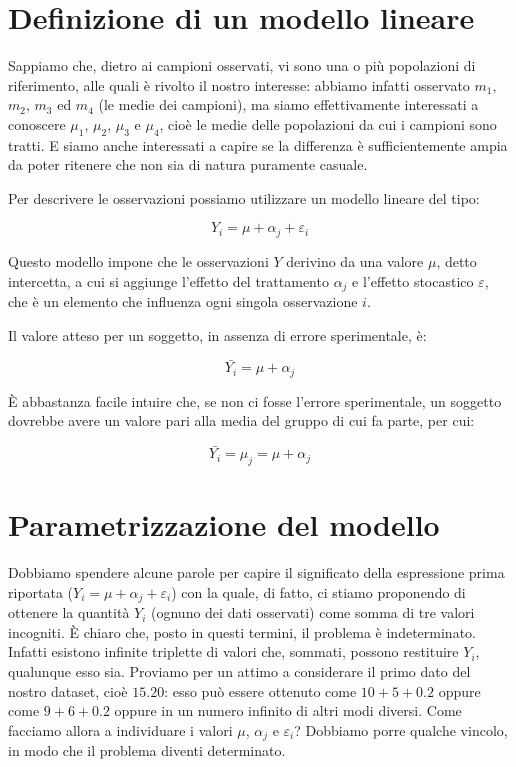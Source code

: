 \documentclass[a4paper,12pt,oneside]{book}
\begin{document}
\hypertarget{definizione-di-un-modello-lineare}{%
\section{Definizione di un modello lineare}\label{definizione-di-un-modello-lineare}}

Sappiamo che, dietro ai campioni osservati, vi sono una o più popolazioni di riferimento, alle quali è rivolto il nostro interesse: abbiamo infatti osservato \(m_1\), \(m_2\), \(m_3\) ed \(m_4\) (le medie dei campioni), ma siamo effettivamente interessati a conoscere \(\mu_1\), \(\mu_2\), \(\mu_3\) e \(\mu_4\), cioè le medie delle popolazioni da cui i campioni sono tratti. E siamo anche interessati a capire se la differenza è sufficientemente ampia da poter ritenere che non sia di natura puramente casuale.

Per descrivere le osservazioni possiamo utilizzare un modello lineare del tipo:

\[Y_i = \mu + \alpha_j + \varepsilon_i\]

Questo modello impone che le osservazioni \(Y\) derivino da una valore \(\mu\), detto intercetta, a cui si aggiunge l'effetto del trattamento \(\alpha_j\) e l'effetto stocastico \(\varepsilon\), che è un elemento che influenza ogni singola osservazione \(i\).

Il valore atteso per un soggetto, in assenza di errore sperimentale, è:

\[\bar{Y_i} = \mu + \alpha_j\]

È abbastanza facile intuire che, se non ci fosse l'errore sperimentale, un soggetto dovrebbe avere un valore pari alla media del gruppo di cui fa parte, per cui:

\[\bar{Y_i} = \mu_j = \mu + \alpha_j\]

\hypertarget{parametrizzazione-del-modello}{%
\section{Parametrizzazione del modello}\label{parametrizzazione-del-modello}}

Dobbiamo spendere alcune parole per capire il significato della espressione prima riportata (\(Y_i = \mu + \alpha_j + \varepsilon_i\)) con la quale, di fatto, ci stiamo proponendo di ottenere la quantità \(Y_i\) (ognuno dei dati osservati) come somma di tre valori incogniti. È chiaro che, posto in questi termini, il problema è indeterminato. Infatti esistono infinite triplette di valori che, sommati, possono restituire \(Y_i\), qualunque esso sia. Proviamo per un attimo a considerare il primo dato del nostro dataset, cioè \(15.20\): esso può essere ottenuto come \(10 + 5 + 0.2\) oppure come \(9 + 6 + 0.2\) oppure in un numero infinito di altri modi diversi. Come facciamo allora a individuare i valori \(\mu\), \(\alpha_j\) e \(\varepsilon_i\)? Dobbiamo porre qualche vincolo, in modo che il problema diventi determinato.
\end{document}
